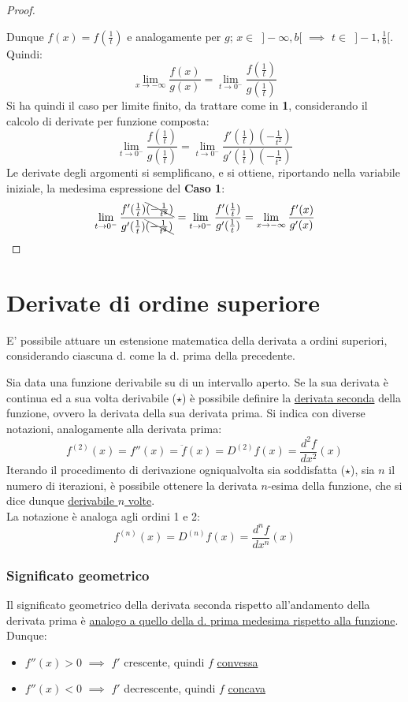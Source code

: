 \documentclass[10pt, oneside]{book}
\theoremstyle{plain}
\begin{document}
\begin{proof}
\begin{itemize}[label=$\circ$]
\end{itemize}
Dunque $f(x) = f(\frac{1}{t})$ e analogamente per $g$; $x \in \enspace ]- \infty, b[$ $\implies$ $t \in \enspace ]-1, \frac{1}{b}[$. Quindi:
\[\lim \limits_{x \rightarrow - \infty} \frac{f(x)}{g(x)} = \lim \limits_{t \rightarrow 0^-} \frac{f(\frac{1}{t})}{g(\frac{1}{t})}\]
Si ha quindi il caso per limite finito, da trattare come in \textbf{1}, considerando il calcolo di derivate per funzione composta:
\[\lim \limits_{t \rightarrow 0^-} \frac{f(\frac{1}{t})}{g(\frac{1}{t})} = \lim \limits_{t \rightarrow 0^-} \frac{f'(\frac{1}{t}) (-\frac{1}{t^2})}{g'(\frac{1}{t}) (-\frac{1}{t^2})}\]
Le derivate degli argomenti si semplificano, e si ottiene, riportando nella variabile iniziale, la medesima espressione del \textbf{Caso 1}:
\[\lim \limits_{t \rightarrow 0^-} \frac{f'(\frac{1}{t}) \bcancel{(-\frac{1}{t^2})}}{g'(\frac{1}{t}) \bcancel{(-\frac{1}{t^2})}} = \lim \limits_{t \rightarrow 0^-} \frac{f'(\frac{1}{t})}{g'(\frac{1}{t})} = \lim \limits_{x \rightarrow - \infty} \frac{f'(x)}{g'(x)}\]
\end{proof}

\chapter{Derivate di ordine superiore}
E' possibile attuare un estensione matematica della derivata a ordini superiori, considerando ciascuna d. come la d. prima della precedente.
\begin{defin}
Sia data una funzione derivabile su di un intervallo aperto. Se la sua derivata è continua ed a sua volta derivabile ($\star$) è possibile definire la \underline{derivata seconda} della funzione, ovvero la derivata della sua derivata prima. 
Si indica con diverse notazioni, analogamente alla derivata prima:
\[f^{(2)}(x) = f''(x) = \ddot{f}(x) = D^{(2)}f(x) = \frac{d^2 f}{d x^2}(x)\]
Iterando il procedimento di derivazione ogniqualvolta sia soddisfatta ($\star$), sia $n$ il numero di iterazioni, è possibile ottenere la derivata $n$-esima della funzione, che si dice dunque \underline{derivabile $n$ volte}.\\
La notazione è analoga agli ordini 1 e 2:
\[f^{(n)}(x) = D^{(n)}f(x) = \frac{d^n f}{d x^n}(x)\]
\end{defin}

\subsection{Significato geometrico}
Il significato geometrico della derivata seconda rispetto all'andamento della derivata prima è \hyperlink{corlagrange}{analogo a quello della d. prima medesima rispetto alla funzione}. Dunque:
\begin{itemize}[label=$\square$]
    \item $f''(x) > 0$ $\implies$ $f'$ crescente, quindi $f$ \underline{convessa}
     \item $f''(x) < 0$ $\implies$ $f'$ decrescente, quindi $f$ \underline{concava}
\end{itemize}
\end{document}
